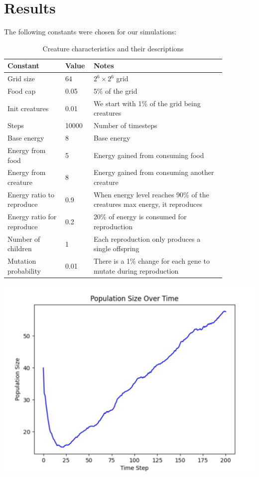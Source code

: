 \documentclass{article}
\begin{document}
\section{Results}
The following constants were chosen for our simulations:
\begin{table}[H]
    \begin{center}
        \begin{tabular}{|p{0.24\linewidth} |p{0.08\linewidth}|p{0.55\linewidth}|}
        \hline
        Constant & Value & Notes  \\\hline
        Grid size & \(64\) & \(2^6\times 2^6\) grid\\\hline        
        Food cap & 0.05 & 5\% of the grid\\\hline
        Init creatures & 0.01 & We start with 1\% of the grid being creatures\\\hline
        Steps & 10000 & Number of timesteps\\\hline
        Base energy & 8 & Base energy\\\hline
        Energy from food & 5 & Energy gained from consuming food\\\hline
        Energy from creature & 8 & Energy gained from consuming another creature\\\hline
        Energy ratio to reproduce & 0.9 & When energy level reaches 90\% of the creatures max energy, it reproduces\\\hline
        Energy ratio for reproduce & 0.2 & 20\% of energy is consumed for reproduction\\\hline
        Number of children & 1 & Each reproduction only produces a single offspring\\\hline
        Mutation probability & 0.01 & There is a 1\% change for each gene to mutate during reproduction\\\hline
    \end{tabular}
    \caption{Creature characteristics and their descriptions}
    \end{center}
    \end{table}
\begin{center}
    \includegraphics[scale=0.2]{images/image1.jpg}
\end{center}
\end{document}
